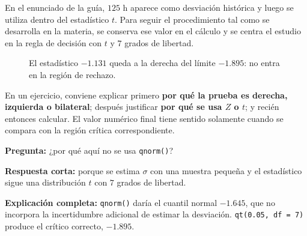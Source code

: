 \documentclass[11pt,a4paper]{article}
\begin{document}
\begin{aclaracion}
En el enunciado de la guía, $125$ h aparece como desviación histórica y luego se utiliza dentro del estadístico $t$. Para seguir el procedimiento tal como se desarrolla en la materia, se conserva ese valor en el cálculo y se centra el estudio en la regla de decisión con $t$ y $7$ grados de libertad.
\end{aclaracion}

\begin{figure}[H]
\centering
{}
\caption{El estadístico $-1.131$ queda a la derecha del límite $-1.895$: no entra en la región de rechazo.}
\end{figure}

\begin{oral}
En un ejercicio, conviene explicar primero \textbf{por qué la prueba es derecha, izquierda o bilateral}; después justificar \textbf{por qué se usa $Z$ o $t$}; y recién entonces calcular. El valor numérico final tiene sentido solamente cuando se compara con la región crítica correspondiente.
\end{oral}

\begin{preguntaoral}
\textbf{Pregunta:} ¿por qué aquí no se usa \texttt{qnorm()}?\par
\textbf{Respuesta corta:} porque se estima $\sigma$ con una muestra pequeña y el estadístico sigue una distribución $t$ con $7$ grados de libertad.\par
\textbf{Explicación completa:} \texttt{qnorm()} daría el cuantil normal $-1.645$, que no incorpora la incertidumbre adicional de estimar la desviación. \texttt{qt(0.05, df = 7)} produce el crítico correcto, $-1.895$.
\end{preguntaoral}
\end{document}
